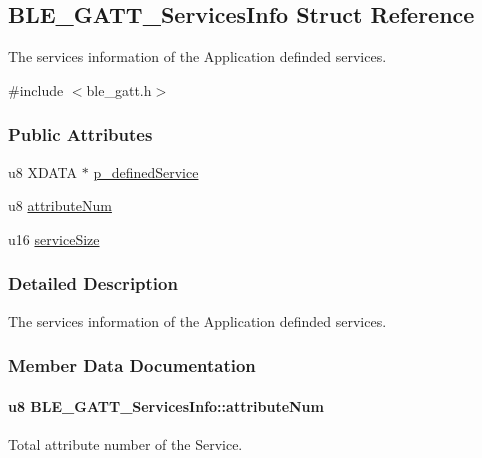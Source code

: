 \hypertarget{struct_b_l_e___g_a_t_t___services_info}{}\subsection{B\+L\+E\+\_\+\+G\+A\+T\+T\+\_\+\+Services\+Info Struct Reference}
\label{struct_b_l_e___g_a_t_t___services_info}


The services information of the Application definded services.  




{\ttfamily \#include $<$ble\+\_\+gatt.\+h$>$}

\subsubsection*{Public Attributes}
\begin{DoxyCompactItemize}
\item 
u8 X\+D\+A\+TA $\ast$ \hyperlink{struct_b_l_e___g_a_t_t___services_info_aeb0741e1cff915d6a636b33b30ea6009}{p\+\_\+defined\+Service}
\item 
u8 \hyperlink{struct_b_l_e___g_a_t_t___services_info_a5f2dcd4423c48be26f4f4acecba0ae34}{attribute\+Num}
\item 
u16 \hyperlink{struct_b_l_e___g_a_t_t___services_info_a4e360af9555faca76a51bc82aaec3dff}{service\+Size}
\end{DoxyCompactItemize}


\subsubsection{Detailed Description}
The services information of the Application definded services. 

\subsubsection{Member Data Documentation}
\paragraph[{\texorpdfstring{attribute\+Num}{attributeNum}}]{\setlength{\rightskip}{0pt plus 5cm}u8 B\+L\+E\+\_\+\+G\+A\+T\+T\+\_\+\+Services\+Info\+::attribute\+Num}\hypertarget{struct_b_l_e___g_a_t_t___services_info_a5f2dcd4423c48be26f4f4acecba0ae34}{}\label{struct_b_l_e___g_a_t_t___services_info_a5f2dcd4423c48be26f4f4acecba0ae34}
Total attribute number of the Service. 
